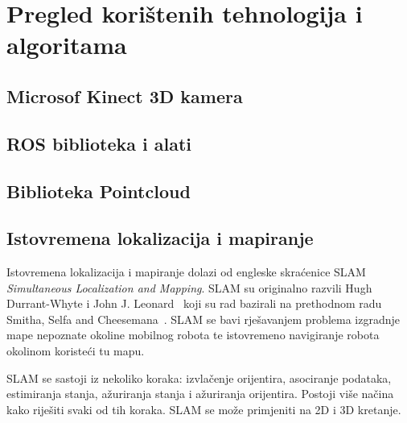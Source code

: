 \newpage
\setcounter{figure}{0}

\section{Pregled korištenih tehnologija i algoritama} %
\label{sec:Tehnologija i teorija}


\subsection{Microsof Kinect 3D kamera} %
\label{sub:Microsof Kinect 3D kamera}


\subsection{ROS biblioteka i alati} %
\label{sub:ROS biblioteka i alati}


\subsection{Biblioteka Pointcloud} %
\label{sub:Biblioteka Pointcloud}



\newpage
\subsection{Istovremena lokalizacija i mapiranje} %
\label{sub:Slam}
Istovremena lokalizacija i mapiranje dolazi od engleske skraćenice
SLAM \textit{Simultaneous Localization and Mapping}. SLAM su
originalno razvili Hugh Durrant-Whyte i John J.
Leonard~\cite{Durrant:91b} koji su rad bazirali na prethodnom radu
Smitha, Selfa and Cheesemana~\cite{Smith86}. SLAM se bavi rješavanjem
problema izgradnje mape nepoznate okoline mobilnog robota te istovremeno
navigiranje robota okolinom koristeći tu mapu.

SLAM se sastoji iz nekoliko koraka: izvlačenje orijentira, asociranje
podataka, estimiranja stanja, ažuriranja stanja i ažuriranja orijentira.
Postoji više načina kako riješiti svaki od tih koraka. SLAM se može
primjeniti na 2D i 3D kretanje.

